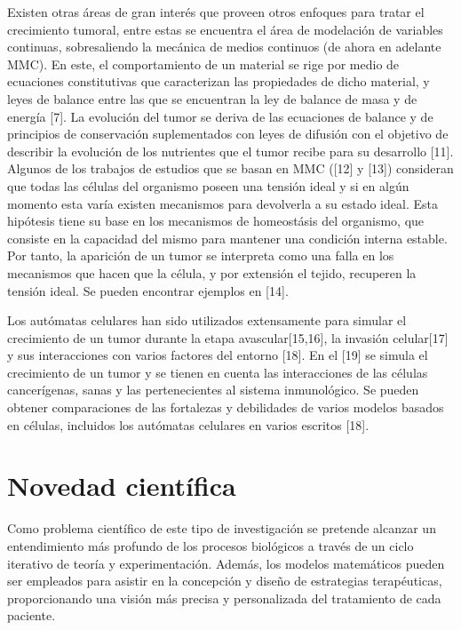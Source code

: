 \hspace{.1cm}Existen otras áreas de gran interés que proveen otros enfoques para tratar el crecimiento tumoral, entre estas se encuentra el \'area de modelaci\'on de variables continuas, sobresaliendo la mecánica de medios continuos (de ahora en adelante MMC). En este, el comportamiento de un material se rige por medio de ecuaciones constitutivas que caracterizan las propiedades de dicho material, y leyes de balance entre las que se encuentran la ley de balance de masa y de energía [7]. La evolución del tumor se deriva de las ecuaciones de balance y de principios de conservación suplementados con leyes de difusión con el objetivo de describir la evolución de los nutrientes que el tumor recibe para su desarrollo [11]. Algunos de los trabajos de estudios que se basan en MMC ([12] y [13]) consideran que todas las células del organismo poseen una tensión ideal y si en algún momento esta varía existen mecanismos para devolverla a su estado ideal. Esta hipótesis tiene su base en los mecanismos de homeost\'asis del organismo, que consiste en la capacidad del mismo para mantener una condición interna estable. Por tanto, la aparición de un tumor se interpreta como una falla en los mecanismos que hacen que la célula, y por extensión el tejido, recuperen la tensión ideal. Se pueden encontrar ejemplos en [14].

\hspace{.1cm}Los autómatas celulares han sido utilizados extensamente para simular el crecimiento de un tumor durante la etapa avascular[15,16], la invasión celular[17] y sus interacciones con varios factores del entorno [18]. En el [19] se simula el crecimiento de un tumor y se tienen en cuenta las interacciones de las células cancerígenas, sanas y las pertenecientes al sistema inmunológico. Se pueden obtener comparaciones de las fortalezas y debilidades de varios modelos basados en células, incluidos los autómatas celulares en varios escritos [18].

\section{Novedad científica} 
\hspace{.1cm}Como problema cient\'ifico de este tipo de investigación se pretende alcanzar un entendimiento más profundo de los procesos biológicos a través de un ciclo iterativo de teoría y experimentación. Además, los modelos matemáticos pueden ser empleados para asistir en la concepción y diseño de estrategias terapéuticas, proporcionando una visión más precisa y personalizada del tratamiento de cada paciente.

